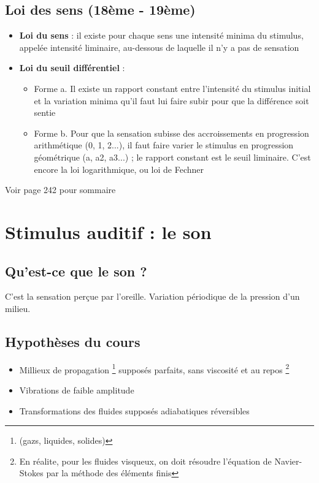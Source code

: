 \subsection{Loi des sens (18ème - 19ème)}
\begin{itemize}
    \item \textbf{Loi du sens} : il existe pour chaque sens une intensité minima du stimulus, appelée intensité liminaire, au-dessous de laquelle il n'y a pas de sensation
    \item \textbf{Loi du seuil différentiel} : 
        \begin{itemize}
            \item Forme a. \newline
            Il existe un rapport constant entre l'intensité du stimulus initial et la variation minima qu'il faut lui faire subir pour que la différence soit sentie
            \item Forme b. \newline
            Pour que la sensation subisse des accroissements en progression arithmétique (0, 1, 2...), il faut faire varier le stimulus en progression géométrique (a, a2, a3...) ; le rapport constant est le seuil liminaire. C'est encore la loi logarithmique, ou loi de Fechner
        \end{itemize}
\end{itemize}
\textcolor{BrickRed}{Voir page 242 pour sommaire}
\newpage
\section{Stimulus auditif : le son}
\subsection{Qu'est-ce que le son ?}
C'est la sensation perçue par l'oreille. Variation périodique de la pression d'un milieu.
\subsection{Hypothèses du cours}
\begin{itemize}
    \item Millieux de propagation \footnote{(gazs, liquides, solides)} supposés parfaits, sans viscosité et au repos \footnote{En réalite, pour les fluides visqueux, on doit résoudre l'équation de Navier-Stokes par la méthode des éléments finis}
    \item Vibrations de faible amplitude
    \item Transformations des fluides supposés adiabatiques réversibles
\end{itemize}
